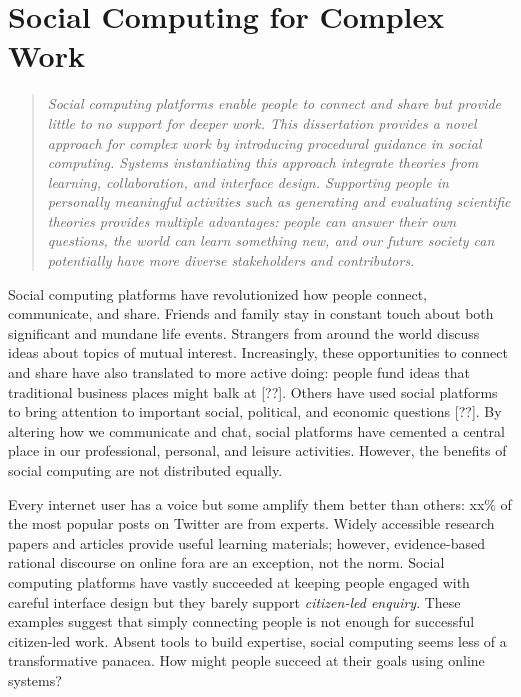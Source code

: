 \chapter{Social Computing for Complex Work}


\begin{quote}
\emph{Social computing platforms enable people to connect and share but provide little to no support for deeper work. This dissertation provides a novel approach for complex work by introducing procedural guidance in social computing. Systems instantiating this approach integrate theories from learning, collaboration, and interface design. Supporting people in personally meaningful activities such as generating and evaluating scientific theories provides multiple advantages: people can answer their own questions, the world can learn something new, and our future society can potentially have more diverse stakeholders and contributors.}
\end{quote}
\vspace{0.25in}

Social computing platforms have revolutionized how people connect, communicate, and share. Friends and family stay in constant touch about both significant and mundane life events. Strangers from around the world discuss ideas about topics of mutual interest. Increasingly, these opportunities to connect and share have also translated to more active doing: people fund ideas that traditional business places might balk at [??]. Others have used social platforms to bring attention to important social, political, and economic questions [??]. By altering how we communicate and chat, social platforms have cemented a central place in our professional, personal, and leisure activities. However, the benefits of social computing are not distributed equally. 

Every internet user has a voice but some amplify them better than others: xx\% of the most popular posts on Twitter are from experts. Widely accessible research papers and articles provide useful learning materials; however, evidence-based rational discourse on online fora are an exception, not the norm. Social computing platforms have vastly succeeded at keeping people engaged with careful interface design but they barely support \textit {citizen-led enquiry}. These examples suggest that simply connecting people is not enough for successful citizen-led work. Absent tools to build expertise, social computing seems less of a transformative panacea. How might people succeed at their goals using online systems?

